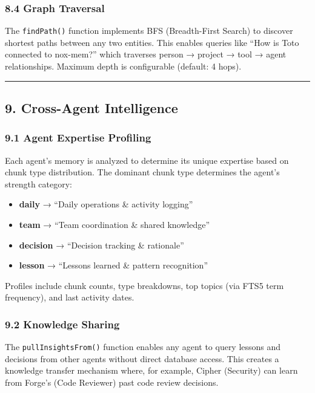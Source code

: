 \documentclass[
]{article}
\providecommand{\tightlist}{%
  \setlength{\itemsep}{0pt}\setlength{\parskip}{0pt}}
\begin{document}
\subsubsection{8.4 Graph Traversal}\label{graph-traversal}

The \texttt{findPath()} function implements BFS (Breadth-First Search)
to discover shortest paths between any two entities. This enables
queries like ``How is Toto connected to nox-mem?'' which traverses
person → project → tool → agent relationships. Maximum depth is
configurable (default: 4 hops).

\begin{center}\rule{0.5\linewidth}{0.5pt}\end{center}

\subsection{9. Cross-Agent Intelligence}\label{cross-agent-intelligence}

\subsubsection{9.1 Agent Expertise
Profiling}\label{agent-expertise-profiling}

Each agent's memory is analyzed to determine its unique expertise based
on chunk type distribution. The dominant chunk type determines the
agent's strength category:

\begin{itemize}
\tightlist
\item
  \textbf{daily} → ``Daily operations \& activity logging''
\item
  \textbf{team} → ``Team coordination \& shared knowledge''
\item
  \textbf{decision} → ``Decision tracking \& rationale''
\item
  \textbf{lesson} → ``Lessons learned \& pattern recognition''
\end{itemize}

Profiles include chunk counts, type breakdowns, top topics (via FTS5
term frequency), and last activity dates.

\subsubsection{9.2 Knowledge Sharing}\label{knowledge-sharing}

The \texttt{pullInsightsFrom()} function enables any agent to query
lessons and decisions from other agents without direct database access.
This creates a knowledge transfer mechanism where, for example, Cipher
(Security) can learn from Forge's (Code Reviewer) past code review
decisions.
\end{document}
